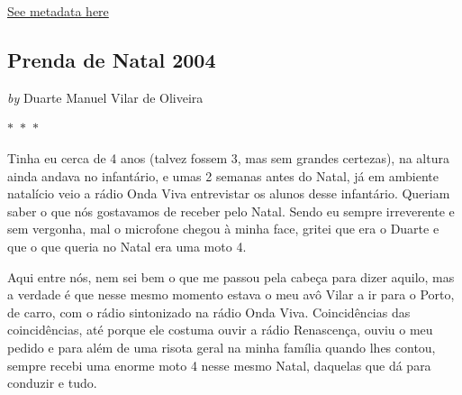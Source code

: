 
\hyperref[table:\arabic{tablecounter}]{See metadata here}

\newpage

\begin{center}

    \section{  Prenda de Natal 2004  }

    
            
                \textit{by} Duarte Manuel Vilar de Oliveira
            
        

     
    
    

$\ast$~$\ast$~$\ast$



\end{center}

\begin{center}
    \begin{minipage}{0.9\textwidth}
        \setlength{\parskip}{0.2cm}
        \setlength{\parindent}{0cm}
        \fontsize{12pt}{14pt}\selectfont
        


Tinha eu cerca de 4 anos (talvez fossem 3, mas sem grandes certezas), na
altura ainda andava no infantário, e umas 2 semanas antes do Natal, já
em ambiente natalício veio a rádio Onda Viva entrevistar os alunos desse
infantário. Queriam saber o que nós gostavamos de receber pelo Natal.
Sendo eu sempre irreverente e sem vergonha, mal o microfone chegou à
minha face, gritei que era o Duarte e que o que queria no Natal era uma
moto 4.

Aqui entre nós, nem sei bem o que me passou pela cabeça para
dizer aquilo, mas a verdade é que nesse mesmo momento estava o meu avô
Vilar a ir para o Porto, de carro, com o rádio sintonizado na rádio Onda
Viva. Coincidências das coincidências, até porque ele costuma ouvir a
rádio Renascença, ouviu o meu pedido e para além de uma risota geral na
minha família quando lhes contou, sempre recebi uma enorme moto 4 nesse
mesmo Natal, daquelas que dá para conduzir e tudo.

    \end{minipage}
\end{center}


